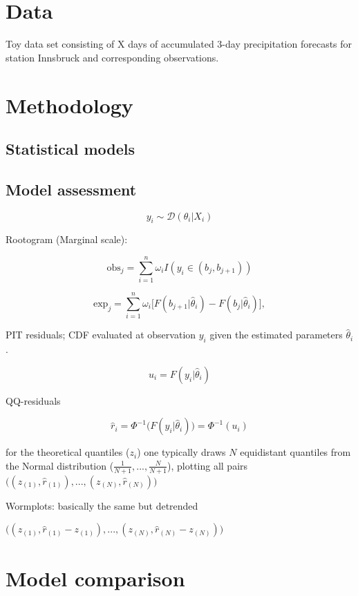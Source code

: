 \documentclass[twoside]{report}
\begin{document}
\section{Data}

Toy data set consisting of X days of accumulated 3-day precipitation
forecasts for station Innsbruck and corresponding observations.

\section{Methodology}

\subsection{Statistical models}

\subsection{Model assessment}

$$
y_i \sim \mathcal{D}(\theta_i | X_i)
$$

Rootogram (Marginal scale):

$$
\text{obs}_j = \sum_{i=1}^n \omega_i I(y_i \in (b_j, b_{j+1}))
$$

$$
\text{exp}_j = \sum_{i=1}^n \omega_i \big[ F(b_{j+1} | \hat{\theta}_i) - F(b_{j} | \hat{\theta}_i) \big],
$$

PIT residuals; CDF evaluated at observation $y_i$ given the
estimated parameters $\hat{\theta}_i$.

$$
u_i = F(y_i | \hat{\theta}_i)
$$


QQ-residuals

$$
\hat{r}_i = \Phi^{-1}\big(F(y_i | \hat{\theta}_i)\big) = \Phi^{-1}(u_i)
$$

for the theoretical quantiles ($z_i$) one typically draws $N$ equidistant
quantiles from the Normal distribution ($\frac{1}{N+1}, ..., \frac{N}{N+1}$),
plotting all pairs $\big((z_{(1)},\hat{r}_{(1)}), ..., (z_{(N)},\hat{r}_{(N)})\big)$

Wormplots: basically the same but detrended

$\big((z_{(1)},\hat{r}_{(1)} - z_{(1)}), ..., (z_{(N)},\hat{r}_{(N)} - z_{(N)})\big)$

\section{Model comparison}
\end{document}
